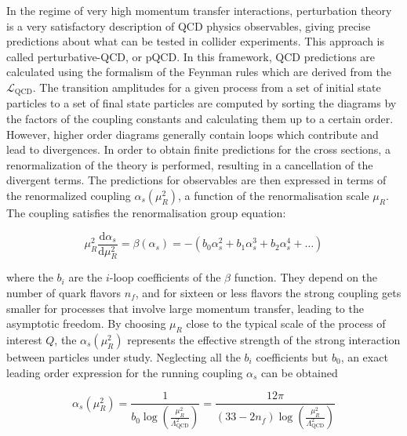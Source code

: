 In the regime of very high momentum transfer interactions, perturbation theory is a very satisfactory description of QCD physics observables, giving precise predictions about what can be tested in collider experiments. This approach is called perturbative-QCD, or pQCD. In this framework, QCD predictions are calculated using the formalism of the Feynman rules which are derived from the $\mathcal{L}_\mathrm{QCD}$.
The transition amplitudes for a given process from a set of initial state particles to a set of final state particles are computed by sorting the diagrams by the factors of the coupling constants and calculating them up to a certain order. However, higher order diagrams generally contain loops which contribute and lead to divergences.
In order to obtain finite predictions for the cross sections, a renormalization of the theory is performed, resulting in a cancellation of the divergent terms.
The predictions for observables are then expressed in terms of the renormalized coupling $\alpha_s(\mu^2_R)$, a function of the renormalisation scale $\mu_R$. 
The coupling satisfies the renormalisation group equation:

\begin{equation}\label{eqn:SM_e48}
\mu^2_R\frac{\mathrm{d}\alpha_s}{\mathrm{d}\mu^2_R} = \beta(\alpha_s) = - (b_0\alpha^2_s + b_1\alpha^3_s + b_2\alpha^4_s + \dotsc)
\end{equation}

\noindent where the $b_i$ are the $i$-loop coefficients of the $\beta$ function.
They depend on the number of quark flavors $n_f$, and for sixteen or less flavors the strong coupling gets smaller for processes that involve large momentum transfer, leading to the asymptotic freedom.
By choosing $\mu_R$ close to the typical scale of the process of interest $Q$, the $\alpha_s(\mu_R^2)$ represents the effective strength of the strong interaction between particles under study.
Neglecting all the $b_i$ coefficients but $b_0$, an exact leading order expression for the running coupling $\alpha_s$ can be obtained

\begin{equation}\label{eqn:SM_e49}
\alpha_s(\mu^2_R) = \frac{1}{b_0\log \left( \frac{\mu^2_R}{\Lambda^2_\mathrm{QCD}} \right) } = \frac{12\pi}{(33-2n_f)\log \left( \frac{\mu^2_R}{\Lambda^2_\mathrm{QCD}} \right) }
\end{equation}

